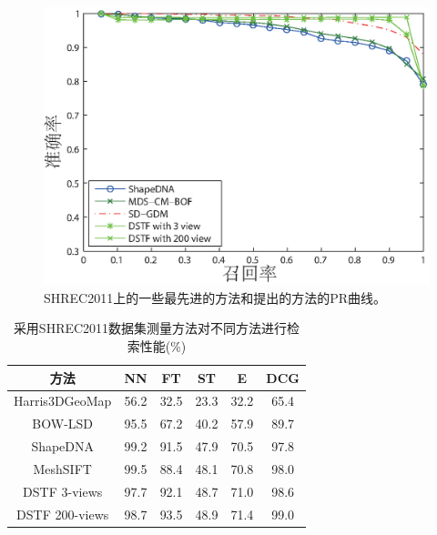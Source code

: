 \begin{figure}[tbhp]
\begin{center}
\includegraphics[width=1.0\linewidth]{figures/all_rp_cl_shrec2011.eps}
\end{center} 
\vspace{-4mm}
\caption{SHREC2011上的一些最先进的方法和提出的方法的PR曲线。} \label{fig_rp_shrec2011}
\end{figure}
\begin{table}[tbhp]
\caption{采用SHREC2011数据集测量方法对不同方法进行检索性能(\%)} \label{table_retrieval_results_shrec2011}
\begin{center}
\begin{tabular}{cccccc}  %
\hline  \hline
方法      						&NN &FT &ST &E &DCG\\ 
\hline
Harris3DGeoMap \cite{Lian2011SHREC}	&56.2	&32.5	&23.3	&32.2	&65.4	\\
BOW-LSD \cite{Lavou2011Bag}				&95.5	&67.2 	&40.2	&57.9	&89.7 \\
ShapeDNA \cite{Reuter2006Laplace}		&99.2 	&91.5 	&47.9	&70.5	&97.8	\\
MeshSIFT \cite{Maes2010Feature}		&99.5	&88.4	&48.1	&70.8	&98.0	\\
DSTF	3-views								&97.7	&92.1	&48.7	&71.0	&98.6	\\
DSTF	200-views							&98.7	&93.5	&48.9	&71.4	&99.0	\\
\hline  \hline      %
\end{tabular}
\end{center} 
\end{table}


